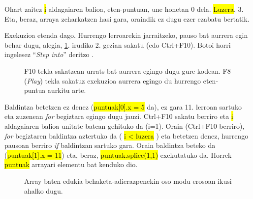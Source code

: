 Ohart zaitez \hl{i} aldagaiaren balioa, eten-puntuan, une honetan 0 dela. \hl{Luzera}, 3. Eta, beraz, arraya zeharkatzen hasi gara, oraindik ez dugu ezer ezabatu bertatik.

Exekuzioa etenda dago. Hurrengo lerroarekin jarraitzeko, pauso bat aurrera egin behar dugu, alegia, \ref{fig:araztaile4}. irudiko 2. gezian sakatu (edo Ctrl+F10). Botoi horri ingelesez ``\textit{Step into}'' deritzo .

\begin{figure}[ht]
	\centering
{}
\caption{F10 tekla sakatzean urrats bat aurrera egingo dugu gure kodean. F8 (\textit{Play}) tekla sakatuz exekuzioa aurrera egingo du hurrengo eten-puntua aurkitu arte.}
\label{fig:araztaile4}
\end{figure}

Baldintza betetzen ez denez (\hl{puntuak[0].x = 5} da), ez gara 11. lerroan sartuko eta zuzenean \textit{for} begiztara egingo dugu jauzi. Ctrl+F10 sakatu berriro eta \hl{i} aldagaiaren balioa unitate batean gehituko da (i=1). Orain (Ctrl+F10 berriro), \textit{for} begiztaren baldintza aztertuko da ( \hl{i < luzera} ) eta betetzen denez, hurrengo pausoan berriro \textit{if} baldintzan sartuko gara. Orain baldintza beteko da (\hl{puntuak[1].x = 11}) eta, beraz, \hl{puntuak.splice(1,1)} exekutatuko da. Horrek \hl{puntuak} arrayari elementu bat kenduko dio. 


\begin{figure}[ht]
	\centering
{}
\caption{Array baten edukia behaketa-adierazpenekin oso modu erosoan ikusi ahalko dugu.}
\label{fig:araztaile5}
\end{figure}

